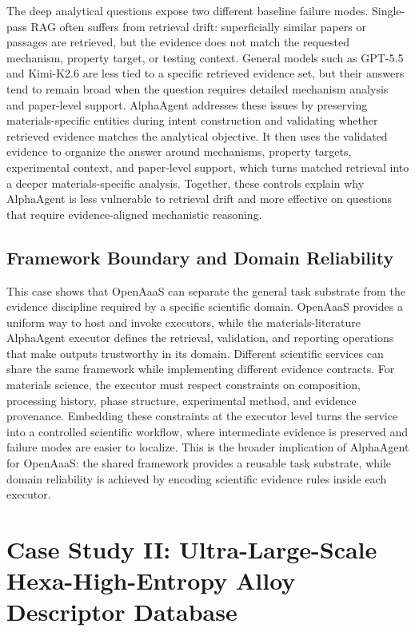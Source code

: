 \documentclass{article}
\begin{document}
The deep analytical questions expose two different baseline failure modes. Single-pass RAG often suffers from retrieval drift: superficially similar papers or passages are retrieved, but the evidence does not match the requested mechanism, property target, or testing context. General models such as GPT-5.5 and Kimi-K2.6 are less tied to a specific retrieved evidence set, but their answers tend to remain broad when the question requires detailed mechanism analysis and paper-level support. AlphaAgent addresses these issues by preserving materials-specific entities during intent construction and validating whether retrieved evidence matches the analytical objective. It then uses the validated evidence to organize the answer around mechanisms, property targets, experimental context, and paper-level support, which turns matched retrieval into a deeper materials-specific analysis. Together, these controls explain why AlphaAgent is less vulnerable to retrieval drift and more effective on questions that require evidence-aligned mechanistic reasoning.

\subsection{Framework Boundary and Domain Reliability}

This case shows that OpenAaaS can separate the general task substrate from the evidence discipline required by a specific scientific domain. OpenAaaS provides a uniform way to host and invoke executors, while the materials-literature AlphaAgent executor defines the retrieval, validation, and reporting operations that make outputs trustworthy in its domain. Different scientific services can share the same framework while implementing different evidence contracts. For materials science, the executor must respect constraints on composition, processing history, phase structure, experimental method, and evidence provenance. Embedding these constraints at the executor level turns the service into a controlled scientific workflow, where intermediate evidence is preserved and failure modes are easier to localize. This is the broader implication of AlphaAgent for OpenAaaS: the shared framework provides a reusable task substrate, while domain reliability is achieved by encoding scientific evidence rules inside each executor.

\section{Case Study II: Ultra-Large-Scale Hexa-High-Entropy Alloy Descriptor Database}
\label{sec:case2}
\end{document}
